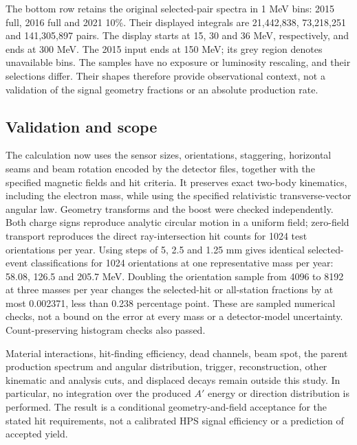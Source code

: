 The bottom row retains the original selected-pair spectra in 1 MeV bins:
2015 full, 2016 full and 2021 10\%. Their displayed integrals are 21,442,838,
73,218,251 and 141,305,897 pairs. The display starts at 15, 30 and 36 MeV,
respectively, and ends at 300 MeV. The 2015 input ends at 150 MeV; its grey
region denotes unavailable bins. The samples have no exposure or luminosity
rescaling, and their selections differ. Their shapes therefore provide
observational context, not a validation of the signal geometry fractions or
an absolute production rate.

\subsection{Validation and scope}
The calculation now uses the sensor sizes, orientations, staggering,
horizontal seams and beam rotation encoded by the detector files, together
with the specified magnetic fields and hit criteria. It preserves
exact two-body kinematics, including the electron mass, while using the
specified relativistic transverse-vector angular law. Geometry transforms and
the boost were checked independently. Both charge signs reproduce analytic
circular motion in a uniform field; zero-field transport reproduces the
direct ray-intersection hit counts for 1024 test orientations per year.
Using steps of 5, 2.5 and 1.25 mm gives identical selected-event classifications
for 1024 orientations at one representative mass per year: 58.08, 126.5 and
205.7 MeV. Doubling the orientation sample from 4096 to 8192 at three masses
per year changes the selected-hit or all-station fractions by at most
0.002371, less than 0.238 percentage point. These are sampled numerical
checks, not a bound on the error at every mass or a detector-model uncertainty.
Count-preserving histogram checks also passed.

Material interactions, hit-finding efficiency, dead channels, beam spot,
the parent production spectrum and angular distribution, trigger,
reconstruction, other kinematic and analysis cuts, and displaced decays
remain outside this study. In particular, no integration over the produced
$A'$ energy or direction distribution is performed. The result is a
conditional geometry-and-field acceptance for the stated hit requirements,
not a calibrated HPS signal efficiency or a prediction of accepted yield.

